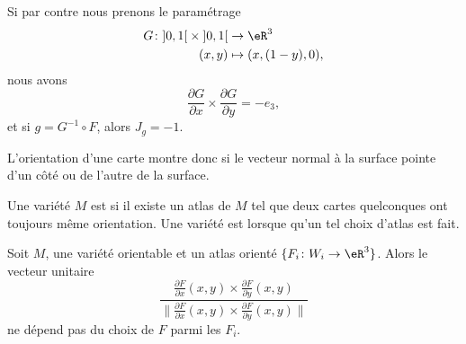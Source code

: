 Si par contre nous prenons le paramétrage
\begin{equation}
	\begin{aligned}
		G\colon \mathopen] 0,1 \mathclose[\times\mathopen] 0,1   \mathclose[ & \to \eR^3            \\
		(x,y)                                                                & \mapsto (x,(1-y),0),
	\end{aligned}
\end{equation}
nous avons
\begin{equation}
	\frac{ \partial G }{ \partial x }\times\frac{ \partial G }{ \partial y }=-e_3,
\end{equation}
et si \( g=G^{-1}\circ F\), alors \( J_g=-1\).

L'orientation d'une carte montre donc si le vecteur normal à la surface pointe d'un côté ou de l'autre de la surface.

\begin{definition}      \label{DEFooSWREooNdQpdA}
	Une variété \( M\) est  si il existe un atlas de \( M\) tel que deux cartes quelconques ont toujours même orientation. Une variété est  lorsque qu'un tel choix d'atlas est fait.
\end{definition}

\begin{proposition}
	Soit \( M\), une variété orientable et un atlas orienté \( \{ F_i\colon W_i\to \eR^3 \}\). Alors le vecteur unitaire
	\begin{equation}
		\frac{   \frac{ \partial F }{ \partial x }(x,y)\times\frac{ \partial F }{ \partial y }(x,y)   }{ \| \frac{ \partial F }{ \partial x }(x,y)\times\frac{ \partial F }{ \partial y }(x,y)\| }
	\end{equation}
	ne dépend pas du choix de \( F\) parmi les \( F_i\).
\end{proposition}


